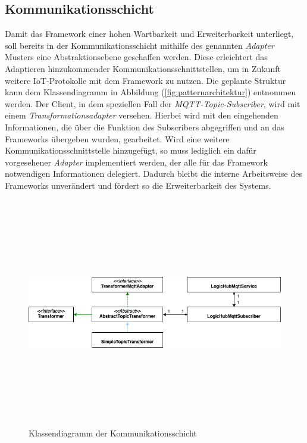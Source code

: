     \subsection{Kommunikationsschicht}
    Damit das Framework einer hohen Wartbarkeit und Erweiterbarkeit unterliegt, soll bereits in der Kommunikationsschicht mithilfe 
    des genannten \textit{Adapter} Musters eine Abstraktionsebene geschaffen werden. Diese erleichtert das Adaptieren 
    hinzukommender Kommunikationsschnittstellen, um in Zukunft weitere \acs{IoT}-Protokolle mit dem Framework zu nutzen. 
    Die geplante Struktur kann dem Klassendiagramm in Abbildung (\ref{fig:patternarchitektur}) entnommen werden. 
    Der Client, in dem speziellen Fall der \textit{\acs{MQTT}-Topic-Subscriber}, wird mit einem \textit{Transformationsadapter} versehen. Hierbei wird mit den eingehenden 
    Informationen, die über die Funktion des Subscribers abgegriffen und an das Frameworks übergeben wurden, gearbeitet. 
    Wird eine weitere Kommunikationsschnittstelle hinzugefügt, so muss lediglich ein dafür vorgesehener \textit{Adapter} implementiert werden, der 
    alle für das Framework notwendigen Informationen delegiert. Dadurch bleibt die interne Arbeitsweise des Frameworks unverändert und fördert so die Erweiterbarkeit des 
    Systems.
    \begin{figure}[hbt!]
        \centering
        \includegraphics[width=14cm,height=10cm,keepaspectratio]{images/Kommunikationsschicht_final.png}
        \caption{Klassendiagramm der Kommunikationsschicht}
        \label{fig:patternkommunikation}
    \end{figure}
    \pagebreak
